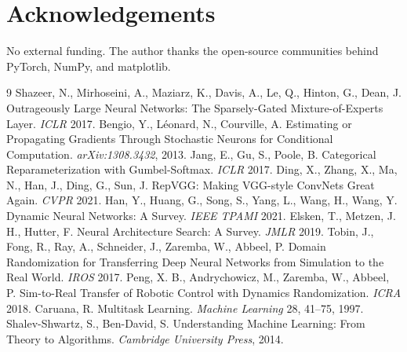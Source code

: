 \documentclass[11pt,a4paper]{article}
\begin{document}
\section*{Acknowledgements}
No external funding. The author thanks the open-source communities behind PyTorch, NumPy, and matplotlib.

\begin{thebibliography}{9}
 Shazeer, N., Mirhoseini, A., Maziarz, K., Davis, A., Le, Q., Hinton, G., Dean, J. Outrageously Large Neural Networks: The Sparsely-Gated Mixture-of-Experts Layer. \emph{ICLR} 2017.
 Bengio, Y., L\'eonard, N., Courville, A. Estimating or Propagating Gradients Through Stochastic Neurons for Conditional Computation. \emph{arXiv:1308.3432}, 2013.
 Jang, E., Gu, S., Poole, B. Categorical Reparameterization with Gumbel-Softmax. \emph{ICLR} 2017.
 Ding, X., Zhang, X., Ma, N., Han, J., Ding, G., Sun, J. RepVGG: Making VGG-style ConvNets Great Again. \emph{CVPR} 2021.
 Han, Y., Huang, G., Song, S., Yang, L., Wang, H., Wang, Y. Dynamic Neural Networks: A Survey. \emph{IEEE TPAMI} 2021.
 Elsken, T., Metzen, J. H., Hutter, F. Neural Architecture Search: A Survey. \emph{JMLR} 2019.
 Tobin, J., Fong, R., Ray, A., Schneider, J., Zaremba, W., Abbeel, P. Domain Randomization for Transferring Deep Neural Networks from Simulation to the Real World. \emph{IROS} 2017.
 Peng, X. B., Andrychowicz, M., Zaremba, W., Abbeel, P. Sim-to-Real Transfer of Robotic Control with Dynamics Randomization. \emph{ICRA} 2018.
 Caruana, R. Multitask Learning. \emph{Machine Learning} 28, 41--75, 1997.
 Shalev-Shwartz, S., Ben-David, S. Understanding Machine Learning: From Theory to Algorithms. \emph{Cambridge University Press}, 2014.
\end{thebibliography}
\end{document}
